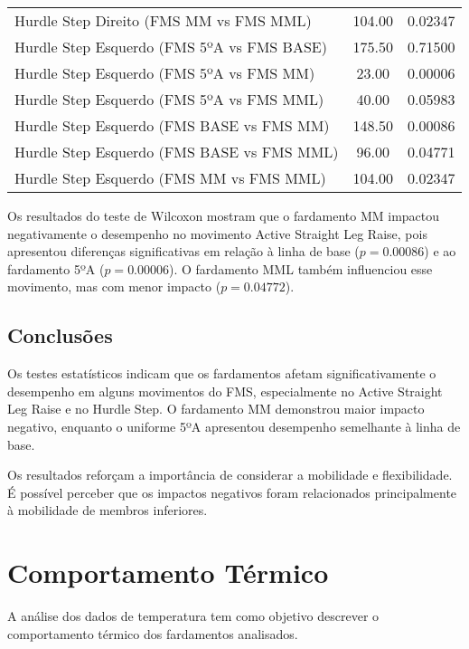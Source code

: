 \begin{table}[H]
\begin{tabular}{lcc}
                Hurdle Step Direito (FMS MM vs FMS MML) & 104.00 & 0.02347 \\
                Hurdle Step Esquerdo (FMS 5ºA vs FMS BASE) & 175.50 & 0.71500 \\
                Hurdle Step Esquerdo (FMS 5ºA vs FMS MM) & 23.00 & 0.00006 \\
                Hurdle Step Esquerdo (FMS 5ºA vs FMS MML) & 40.00 & 0.05983 \\
                Hurdle Step Esquerdo (FMS BASE vs FMS MM) & 148.50 & 0.00086 \\
                Hurdle Step Esquerdo (FMS BASE vs FMS MML) & 96.00 & 0.04771 \\
                Hurdle Step Esquerdo (FMS MM vs FMS MML) & 104.00 & 0.02347 \\
                \hline
            \end{tabular}
            \end{table}

        Os resultados do teste de Wilcoxon mostram que o fardamento \acrlong{MM} impactou negativamente o desempenho no movimento Active Straight Leg Raise, pois apresentou diferenças significativas em relação à linha de base ($p = 0.00086$) e ao fardamento 5ºA ($p = 0.00006$). O fardamento \acrlong{MML} também influenciou esse movimento, mas com menor impacto ($p = 0.04772$).

    \subsection{Conclusões}
        Os testes estatísticos indicam que os fardamentos afetam significativamente o desempenho em alguns movimentos do \acrshort{FMS}, especialmente no Active Straight Leg Raise e no Hurdle Step. O fardamento \acrlong{MM} demonstrou maior impacto negativo, enquanto o uniforme 5ºA apresentou desempenho semelhante à linha de base.

        \tab Os resultados reforçam a importância de considerar a mobilidade e flexibilidade. É possível perceber que os impactos negativos foram relacionados principalmente à mobilidade de membros inferiores.

\section{Comportamento Térmico}
    A análise dos dados de temperatura tem como objetivo descrever o comportamento térmico dos fardamentos analisados.


